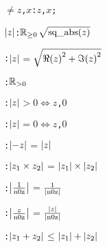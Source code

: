 \begin{alltt}
  \(\neq\)\pvsid{(}\(z\), \(x\)\pvsid{)}:   \pvskey{=} \pvsid{(}\(z\), \(x\)\pvsid{)};\vspace*{\pvsdeclspacing}

  \(\absonefn{z}\): \({\pvssubscript{\mathbb{R}}{{\geq}0}}\) \pvskey{=} \(\sqrtonefn{\pvsid{sq\_abs}\pvsid{(}z\pvsid{)}}\)\vspace*{\pvsdeclspacing}

  :  \(\absonefn{z}\) \(=\) \(\sqrtonefn{\opplustwofn{\sqonefn{\Reonefn{z}}}{\sqonefn{\Imonefn{z}}}}\)\vspace*{\pvsdeclspacing}

  :  \pvsid{(}\pvsid{)}  \({\pvssubscript{\mathbb{R}}{{>}0}}\)\vspace*{\pvsdeclspacing}

  :  \(\absonefn{z}\) \(>\) \(0\) \(\Leftrightarrow\) \pvsid{(}\(z\), \(0\)\pvsid{)}\vspace*{\pvsdeclspacing}

  :  \(\absonefn{z}\) \(=\) \(0\) \(\Leftrightarrow\) \pvsid{(}\(z\), \(0\)\pvsid{)}\vspace*{\pvsdeclspacing}

  :  \(\absonefn{\opdifferenceonefn{z}}\) \(=\) \(\absonefn{z}\)\vspace*{\pvsdeclspacing}

  :  \(\absonefn{\optimestwofn{z\sb{1}}{z\sb{2}}}\) \(=\) \(\optimestwofn{\absonefn{z\sb{1}}}{\absonefn{z\sb{2}}}\)\vspace*{\pvsdeclspacing}

  :  \(\absonefn{\opdividetwofn{1}{\pvsid{n0z}}}\) \(=\) \(\opdividetwofn{1}{\absonefn{\pvsid{n0z}}}\)\vspace*{\pvsdeclspacing}

  :  \(\absonefn{\opdividetwofn{z}{\pvsid{n0z}}}\) \(=\) \(\opdividetwofn{\absonefn{z}}{\absonefn{\pvsid{n0z}}}\)\vspace*{\pvsdeclspacing}

  :  \(\absonefn{\opplustwofn{z\sb{1}}{z\sb{2}}}\) \(\leq\) \(\opplustwofn{\absonefn{z\sb{1}}}{\absonefn{z\sb{2}}}\)\vspace*{\pvsdeclspacing}


\end{alltt}
